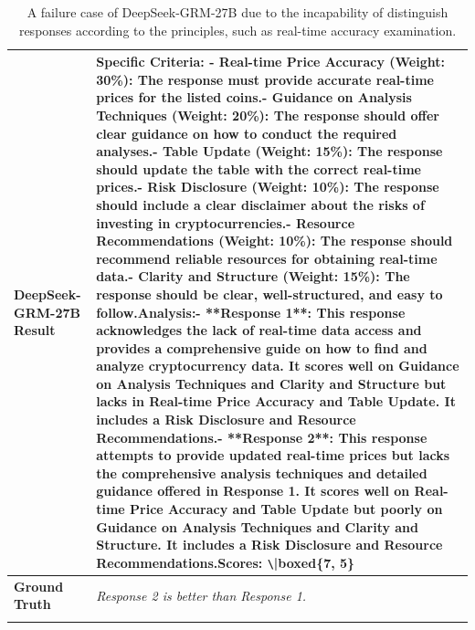 \documentclass{article} %
\newcommand{\SGRM}{DeepSeek-GRM-27B\xspace}
\begin{document}
\begin{center}
\begin{longtable}{p{2.5cm}|p{10cm}}
   \textbf{\SGRM Result}   &   Specific Criteria: \newline - Real-time Price Accuracy (Weight: 30\%): The response must provide accurate real-time prices for the listed coins.\newline - Guidance on Analysis Techniques (Weight: 20\%): The response should offer clear guidance on how to conduct the required analyses.\newline - Table Update (Weight: 15\%): The response should update the table with the correct real-time prices.\newline - Risk Disclosure (Weight: 10\%): The response should include a clear disclaimer about the risks of investing in cryptocurrencies.\newline - Resource Recommendations (Weight: 10\%): The response should recommend reliable resources for obtaining real-time data.\newline - Clarity and Structure (Weight: 15\%): The response should be clear, well-structured, and easy to follow.\newline\newline Analysis:\newline - **Response 1**: This response acknowledges the lack of real-time data access and provides a comprehensive guide on how to find and analyze cryptocurrency data. It scores well on Guidance on Analysis Techniques and Clarity and Structure but lacks in Real-time Price Accuracy and Table Update. It includes a Risk Disclosure and Resource Recommendations.\newline - **Response 2**: This response attempts to provide updated real-time prices but lacks the comprehensive analysis techniques and detailed guidance offered in Response 1. It scores well on Real-time Price Accuracy and Table Update but poorly on Guidance on Analysis Techniques and Clarity and Structure. It includes a Risk Disclosure and Resource Recommendations.\newline\newline Scores: {\color{red}\verb|\|boxed\{7, 5\}}     \\ \midrule
   \textbf{Ground Truth}   &     \textit{Response 2 is better than Response 1.}      \\
\bottomrule
\caption{A failure case of \SGRM due to the incapability of distinguish responses according to the principles, such as real-time accuracy examination.}\label{tab:cases-3}
\end{longtable}
\end{center}
\end{document}
